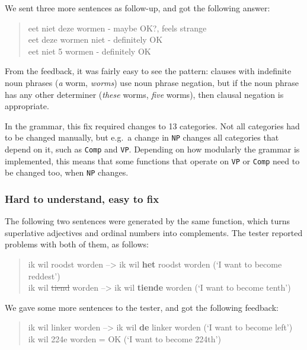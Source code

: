 \noindent We sent three more sentences as follow-up, and got the
following answer:

\begin{quote}
eet niet deze wormen - maybe OK?, feels strange\\eet deze wormen niet -
definitely OK\\eet niet 5 wormen - definitely OK
\end{quote}

\noindent From the feedback, it was fairly easy to see the pattern:
clauses with indefinite noun phrases (\emph{a} worm, \emph{worms}) use
noun phrase negation, but if the noun phrase has any other determiner
(\emph{these} worms, \emph{five} worms), then clausal negation is
appropriate. 

In the grammar, this fix required changes to 13 categories. Not all
categories had to be changed manually, but e.g.~a change in \texttt{NP}
changes all categories that depend on it, such as \texttt{Comp} and
\texttt{VP}. Depending on how modularly the grammar is implemented, this
means that some functions that operate on \texttt{VP} or \texttt{Comp}
need to be changed too, when \texttt{NP} changes.

\subsubsection{Hard to understand, easy to fix}\label{hard-to-understand-easy-to-fix}

The following two sentences were generated by the same function, which
turns superlative adjectives and ordinal numbers into complements. The
tester reported problems with both of them, as follows:

\begin{quote}
ik wil roodst worden --\textgreater{} ik wil \textbf{het} roodst worden
(`I want to become reddest')\\ik wil \sout{tiend} worden
--\textgreater{} ik wil \textbf{tiende} worden (`I want to become
tenth')
\end{quote}

\noindent We gave some more sentences to the tester, and got the following
feedback:

\begin{quote}
ik wil linker worden --\textgreater{} ik wil \textbf{de} linker worden
(`I want to become left')\\ik wil 224e worden = OK (`I want to become
224th')
\end{quote}


